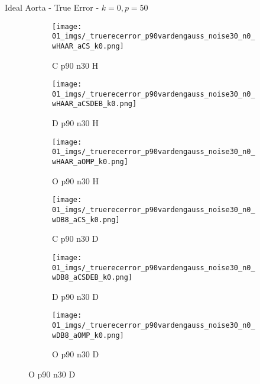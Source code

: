 \begin{frame}{Ideal Aorta - True Error - $k=0,p=50$}{}
\begin{figure}
\begin{subfigure}{0.13\textwidth}
\texttt{[image: 01\_imgs/\_truerecerror\_p90vardengauss\_noise30\_n0\_wHAAR\_aCS\_k0.png]}
\caption*{\tiny C p90 n30 H}
\end{subfigure}
\begin{subfigure}{0.13\textwidth}
\texttt{[image: 01\_imgs/\_truerecerror\_p90vardengauss\_noise30\_n0\_wHAAR\_aCSDEB\_k0.png]}
\caption*{\tiny D p90 n30 H}
\end{subfigure}
\begin{subfigure}{0.13\textwidth}
\texttt{[image: 01\_imgs/\_truerecerror\_p90vardengauss\_noise30\_n0\_wHAAR\_aOMP\_k0.png]}
\caption*{\tiny O p90 n30 H}
\end{subfigure}
\begin{subfigure}{0.13\textwidth}
\texttt{[image: 01\_imgs/\_truerecerror\_p90vardengauss\_noise30\_n0\_wDB8\_aCS\_k0.png]}
\caption*{\tiny C p90 n30 D}
\end{subfigure}
\begin{subfigure}{0.13\textwidth}
\texttt{[image: 01\_imgs/\_truerecerror\_p90vardengauss\_noise30\_n0\_wDB8\_aCSDEB\_k0.png]}
\caption*{\tiny D p90 n30 D}
\end{subfigure}
\begin{subfigure}{0.13\textwidth}
\texttt{[image: 01\_imgs/\_truerecerror\_p90vardengauss\_noise30\_n0\_wDB8\_aOMP\_k0.png]}
\caption*{\tiny O p90 n30 D}
\end{subfigure}
\end{figure}
\end{frame}


